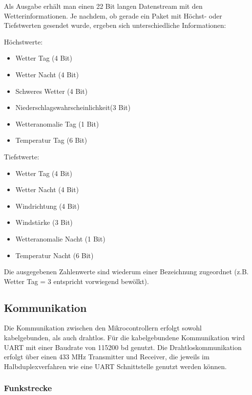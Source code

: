\documentclass[a4paper,11pt]{article}
\begin{document}
\noindent
Als Ausgabe erhält man einen 22 Bit langen Datenstream mit den Wetterinformationen. Je nachdem, ob gerade ein Paket mit Höchst- oder Tiefstwerten gesendet wurde, 
ergeben sich unterschiedliche Informationen:

\vspace{0.2cm}
\noindent
Höchstwerte:
\begin{itemize}
  \item Wetter Tag (4 Bit)
  \item Wetter Nacht (4 Bit)
  \item Schweres Wetter (4 Bit)
  \item Niederschlagswahrscheinlichkeit(3 Bit)
  \item Wetteranomalie Tag (1 Bit)
  \item Temperatur Tag (6 Bit)
\end{itemize}

\vspace{0.2cm}
\noindent
Tiefstwerte:
\begin{itemize}
  \item Wetter Tag (4 Bit)
  \item Wetter Nacht (4 Bit)
  \item Windrichtung (4 Bit)
  \item Windstärke (3 Bit)
  \item Wetteranomalie Nacht (1 Bit)
  \item Temperatur Nacht (6 Bit)
\end{itemize}

\noindent
Die ausgegebenen Zahlenwerte sind wiederum einer Bezeichnung zugeordnet (z.B. Wetter Tag = 3 entspricht vorwiegend bewölkt).

\newpage
\subsection{Kommunikation}
\label{subsub:kommunikation}

Die Kommunikation zwischen den Mikrocontrollern erfolgt sowohl kabelgebunden, als auch drahtlos. Für die kabelgebundene Kommunikation wird UART mit einer Baudrate
von 115200 bd genutzt. Die Drahtloskommunikation erfolgt über einen 433 MHz Transmitter und Receiver, die jeweils im Halbduplexverfahren wie eine UART Schnittstelle
genutzt werden können. 

\subsubsection{Funkstrecke}
\label{subsubsub:funkstrecke}
\end{document}
